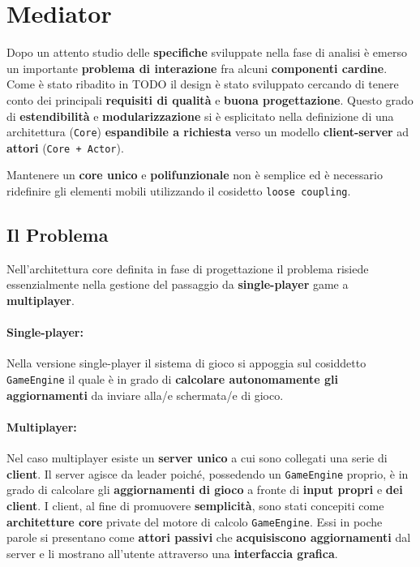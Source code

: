 \section{Mediator}
\label{sec:mediator_design}

Dopo un attento studio delle \textbf{specifiche} sviluppate nella fase di analisi è emerso un importante \textbf{problema di interazione} fra alcuni \textbf{componenti cardine}. Come è stato ribadito in TODO il design è stato sviluppato cercando di tenere conto dei principali \textbf{requisiti di qualità} e \textbf{buona progettazione}. Questo grado di \textbf{estendibilità} e \textbf{modularizzazione} si è esplicitato nella definizione di una architettura (\texttt{Core}) \textbf{espandibile a richiesta} verso un modello \textbf{client-server} ad \textbf{attori} (\texttt{Core + Actor}).

Mantenere un \textbf{core unico} e \textbf{polifunzionale} non è semplice ed è necessario ridefinire gli elementi mobili utilizzando il cosidetto \texttt{loose coupling}. 

\subsection{Il Problema}
Nell'architettura core definita in fase di progettazione il problema risiede essenzialmente nella gestione del passaggio da \textbf{single-player} game a \textbf{multiplayer}. 

\paragraph{Single-player:}
Nella versione single-player il sistema di gioco si appoggia sul cosiddetto \texttt{GameEngine} il quale è in grado di \textbf{calcolare autonomamente gli aggiornamenti} da inviare alla/e schermata/e di gioco.

\paragraph{Multiplayer:}
Nel caso multiplayer esiste un \textbf{server unico} a cui sono collegati una serie di \textbf{client}. Il server agisce da leader poiché, possedendo un \texttt{GameEngine} proprio, è in grado di calcolare gli \textbf{aggiornamenti di gioco} a fronte di \textbf{input propri} e \textbf{dei client}. I client, al fine di promuovere \textbf{semplicità}, sono stati concepiti come \textbf{architetture core} private del motore di calcolo \texttt{GameEngine}. Essi in poche parole si presentano come \textbf{attori passivi} che \textbf{acquisiscono aggiornamenti} dal server e li mostrano all'utente attraverso una \textbf{interfaccia grafica}.

